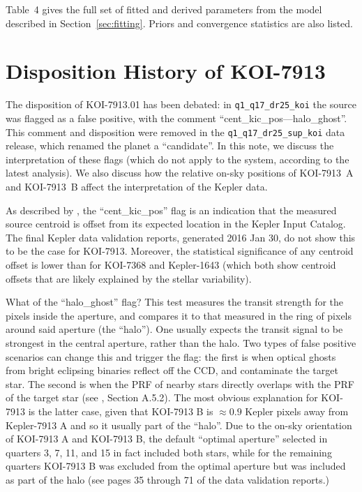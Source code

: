\documentclass[12pt,twocolumn,tighten,linenumbers]{aastex63}
\begin{document}
Table~4 gives the full set of fitted and derived
parameters from the model described in Section~\ref{sec:fitting}.
Priors and convergence statistics are also listed.


\section{Disposition History of KOI-7913}
\label{app:koi7913}

The disposition of KOI-7913.01 has been debated: in
\texttt{q1\_q17\_dr25\_koi} the source was flagged as a false
positive, with the comment ``cent\_kic\_pos---halo\_ghost''.  This
comment and disposition were removed in the
\texttt{q1\_q17\_dr25\_sup\_koi} data release, which renamed the
planet a ``candidate''.  In this note, we discuss the interpretation
of these flags (which do not apply to the system, according to the
latest analysis).  We also discuss how the relative on-sky positions of
KOI-7913~A and KOI-7913~B affect the interpretation of the Kepler
data.

As described by \citet{thompson_planetary_2018}, the
``cent\_kic\_pos'' flag is an indication that the measured source
centroid is offset from its expected location in the Kepler Input
Catalog.  The final Kepler data validation reports, generated 2016 Jan
30, do not show this to be the case for KOI-7913.  Moreover, the
statistical significance of any centroid offset is lower than for
KOI-7368 and Kepler-1643 (which both show centroid offsets that are
likely explained by the stellar variability).

What of the ``halo\_ghost'' flag?  This test measures the transit
strength for the pixels inside the aperture, and compares it to that
measured in the ring of pixels around said aperture (the ``halo'').
One usually expects the transit signal to be strongest in the
central aperture, rather than the halo.  Two types of false positive
scenarios can change this and trigger the flag: the first is when
optical ghosts from bright eclipsing binaries reflect off the CCD, and
contaminate the target star.  The second is when the PRF of nearby
stars directly overlaps with the PRF of the target star (see
\citealt{thompson_planetary_2018}, Section A.5.2).  The most obvious
explanation for KOI-7913 is the latter case, given that KOI-7913 B is
$\approx0.9$ Kepler pixels away from Kepler-7913 A and so it usually
part of the ``halo''.  Due to the on-sky orientation of KOI-7913 A and
KOI-7913 B, the default ``optimal aperture'' selected in quarters 3,
7, 11, and 15 in fact included both stars, while for the remaining
quarters KOI-7913 B was excluded from the optimal aperture but was
included as part of the halo (see pages 35 through 71 of the data
validation reports.)  
\end{document}
